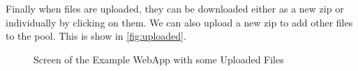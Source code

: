 Finally when files are uploaded, they can be downloaded either as a new zip or individually by clicking on them. We can also upload a new zip to add other files to the pool. This is show in \autoref{fig:uploaded}.

\begin{figure}[H]
    \centering
    \caption{Screen of the Example WebApp with some Uploaded Files}
    \label{fig:uploaded}
\end{figure}

